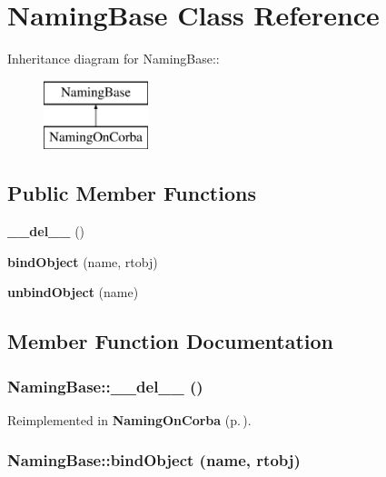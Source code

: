\section{Naming\-Base Class Reference}
\label{classNamingBase}
Inheritance diagram for Naming\-Base::\begin{figure}[H]
\begin{center}
\leavevmode
\includegraphics[height=2cm]{classNamingBase}
\end{center}
\end{figure}
\subsection*{Public Member Functions}
\begin{CompactItemize}
\item 
{\bf \_\-\_\-del\_\-\_\-} ()
\item 
{\bf bind\-Object} (name, rtobj)
\item 
{\bf unbind\-Object} (name)
\end{CompactItemize}


\subsection{Member Function Documentation}
\subsubsection{\setlength{\rightskip}{0pt plus 5cm}Naming\-Base::\_\-\_\-del\_\-\_\- ()}\label{classNamingBase_NamingBasea0}




Reimplemented in {\bf Naming\-On\-Corba} {\rm (p.\,\pageref{classNamingOnCorba_NamingOnCorbaa0})}.
\subsubsection{\setlength{\rightskip}{0pt plus 5cm}Naming\-Base::bind\-Object (name, rtobj)}\label{classNamingBase_NamingBasea1}




